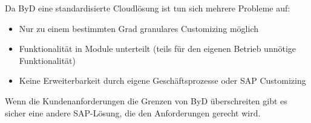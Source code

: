 \documentclass{handout}
\begin{document}
Da ByD eine standardisierte Cloudlösung ist tun sich mehrere Probleme auf:

\begin{itemize}
\item Nur zu einem bestimmten Grad granulares Customizing möglich
\item Funktionalität in Module unterteilt (teils für den eigenen Betrieb unnötige Funktionalität)
\item Keine Erweiterbarkeit durch eigene Geschäftsprozesse oder SAP Customizing
\end{itemize}

Wenn die Kundenanforderungen die Grenzen von ByD überschreiten gibt es sicher eine andere SAP-Lösung, die den Anforderungen gerecht wird.


\newpage


\end{document}
